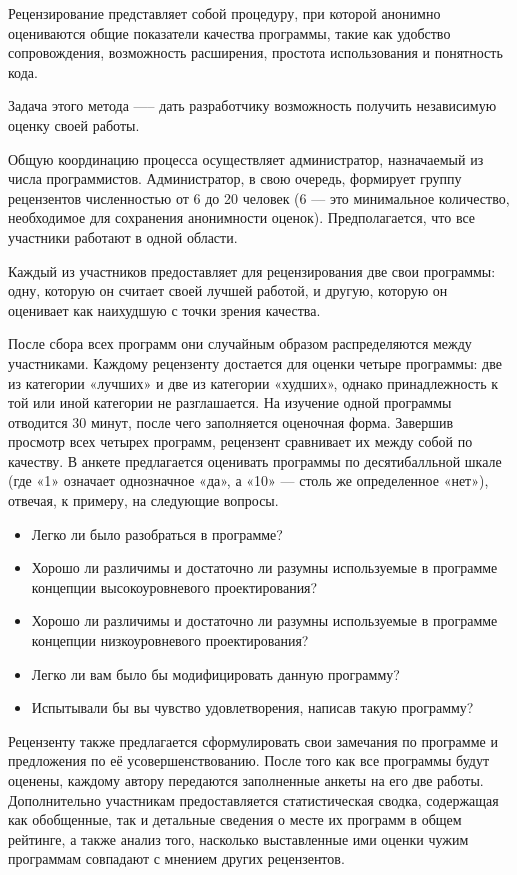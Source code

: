 \documentclass{article}[14pt]
\begin{document}
Рецензирование представляет собой процедуру, при которой анонимно оцениваются общие показатели качества программы, 
такие как удобство сопровождения, возможность расширения, простота использования и понятность кода.

Задача этого метода —-- дать разработчику возможность получить независимую оценку своей работы.

Общую координацию процесса осуществляет администратор, назначаемый из числа программистов. Администратор, в свою очередь, 
формирует группу рецензентов численностью от 6 до 20 человек (6 — это минимальное количество, необходимое для сохранения 
анонимности оценок). Предполагается, что все участники работают в одной области.

Каждый из участников предоставляет для рецензирования две свои программы: одну, которую он считает своей лучшей работой, 
и другую, которую он оценивает как наихудшую с точки зрения качества.

После сбора всех программ они случайным образом распределяются между участниками. Каждому рецензенту достается для 
оценки четыре программы: две из категории «лучших» и две из категории «худших», однако принадлежность к той или иной 
категории не разглашается. На изучение одной программы отводится 30 минут, после чего заполняется оценочная форма. 
Завершив просмотр всех четырех программ, рецензент сравнивает их между собой по качеству. В анкете предлагается оценивать 
программы по десятибалльной шкале (где «1» означает однозначное «да», а «10» — столь же определенное «нет»), отвечая, к 
примеру, на следующие вопросы.

\begin{itemize}
    \item Легко ли было разобраться в программе?
    \item Хорошо ли различимы и достаточно ли разумны используемые в программе
    концепции высокоуровневого проектирования?
    \item Хорошо ли различимы и достаточно ли разумны используемые в программе
    концепции низкоуровневого проектирования?
    \item Легко ли вам было бы модифицировать данную программу?
    \item Испытывали бы вы чувство удовлетворения, написав такую программу?
\end{itemize}

Рецензенту также предлагается сформулировать свои замечания по программе и предложения по её усовершенствованию. 
После того как все программы будут оценены, каждому автору передаются заполненные анкеты на его две работы. Дополнительно 
участникам предоставляется статистическая сводка, содержащая как обобщенные, так и детальные сведения о месте их программ 
в общем рейтинге, а также анализ того, насколько выставленные ими оценки чужим программам совпадают с мнением других 
рецензентов.
\end{document}
